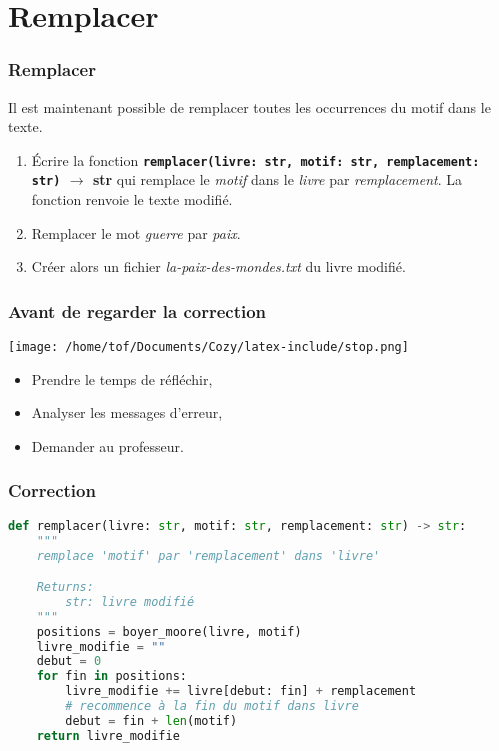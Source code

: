 \documentclass[svgnames,11pt]{beamer}
\begin{document}
\section{Remplacer}
\begin{frame}
    \frametitle{Remplacer}

    Il est maintenant possible de remplacer toutes les occurrences du motif dans le texte.
\begin{activite}
\begin{enumerate}
    \item Écrire la fonction \textbf{\texttt{remplacer(livre: str, motif: str, remplacement: str)} $\rightarrow$ str} qui remplace le \emph{motif} dans le \emph{livre} par \emph{remplacement}. La fonction renvoie le texte modifié.
    \item Remplacer le mot \emph{guerre} par \emph{paix}.
    \item Créer alors un fichier \emph{la-paix-des-mondes.txt} du livre modifié.
\end{enumerate}
\end{activite}

\end{frame}
\begin{frame}
    \frametitle{Avant de regarder la correction}
\begin{center}
    \centering
    \texttt{[image: /home/tof/Documents/Cozy/latex-include/stop.png]}
    \end{center}
{\Large
    \begin{itemize}
        \item Prendre le temps de réfléchir,
        \item Analyser les messages d'erreur,
        \item Demander au professeur.
    \end{itemize}
}
\end{frame}
\begin{frame}[fragile]
    \frametitle{Correction}

\begin{center}
\begin{lstlisting}[language=Python , basicstyle=\small, xleftmargin=2em, xrightmargin=2em]
def remplacer(livre: str, motif: str, remplacement: str) -> str:
    """
    remplace 'motif' par 'remplacement' dans 'livre'

    Returns:
        str: livre modifié
    """
    positions = boyer_moore(livre, motif)
    livre_modifie = ""
    debut = 0
    for fin in positions:
        livre_modifie += livre[debut: fin] + remplacement
        # recommence à la fin du motif dans livre
        debut = fin + len(motif)
    return livre_modifie
\end{lstlisting}
\end{center}  

\end{frame}
\end{document}
